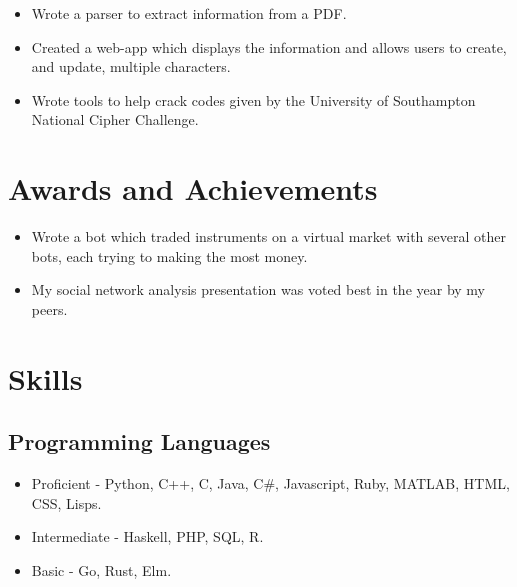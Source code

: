 \documentclass{jcgcv}
\begin{document}
\begin{column}
\begin{itemize}
  \item Wrote a parser to extract information from a PDF.
  \item Created a web-app which displays the information and allows users to create, and update, multiple characters.
\end{itemize}

\begin{itemize}
  \item Wrote tools to help crack codes given by the University of Southampton National Cipher Challenge.
\end{itemize}



\section{Awards and Achievements}

\begin{itemize}
  \item Wrote a bot which traded instruments on a virtual market with several other bots, each trying to making the most money.
\end{itemize}

\begin{itemize}
  \item My social network analysis presentation was voted best in the year by my peers.
\end{itemize}



\section{Skills}

\subsection{Programming Languages}
\begin{itemize}
  \item Proficient - Python, C++, C, Java, C\#, Javascript, Ruby, MATLAB, HTML, CSS, Lisps.
  \item Intermediate - Haskell, PHP, SQL, R.
  \item Basic - Go, Rust, Elm.
\end{itemize}


\end{column}
\end{document}

